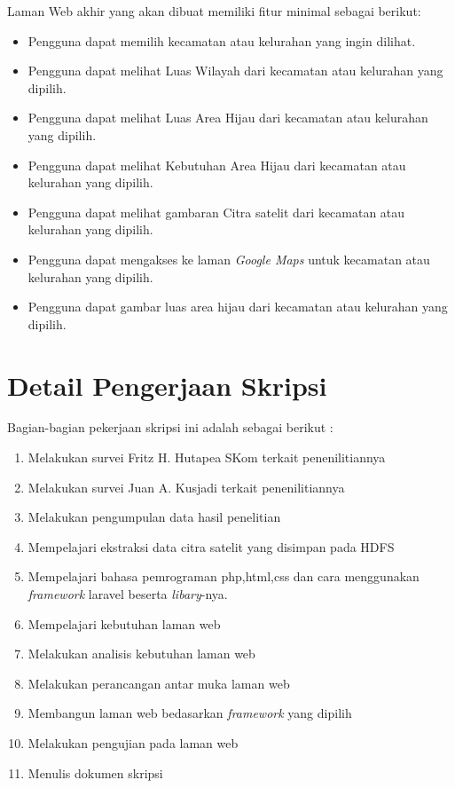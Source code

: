 \documentclass[a4paper,twoside]{article}
\begin{document}
Laman Web akhir yang akan dibuat memiliki fitur minimal sebagai berikut:
\begin{itemize}
	\item Pengguna dapat memilih kecamatan atau kelurahan yang ingin dilihat.
	\item Pengguna dapat melihat Luas Wilayah dari kecamatan atau kelurahan yang dipilih.
	\item Pengguna dapat melihat Luas Area Hijau dari kecamatan atau kelurahan yang dipilih.
	\item Pengguna dapat melihat Kebutuhan Area Hijau dari kecamatan atau kelurahan yang dipilih.
	\item Pengguna dapat melihat gambaran Citra satelit dari kecamatan atau kelurahan yang dipilih.
	\item Pengguna dapat mengakses ke laman \emph{Google Maps} untuk kecamatan atau kelurahan yang dipilih.
	\item Pengguna dapat gambar luas area hijau dari kecamatan atau kelurahan yang dipilih.
		
\end{itemize}

\section{Detail Pengerjaan Skripsi}
Bagian-bagian pekerjaan skripsi ini adalah sebagai berikut :
	\begin{enumerate}
		\item Melakukan survei Fritz H. Hutapea SKom terkait penenilitiannya
		\item Melakukan survei Juan A. Kusjadi terkait penenilitiannya
		\item Melakukan pengumpulan data hasil penelitian
		\item Mempelajari ekstraksi data citra satelit yang disimpan pada HDFS
		\item Mempelajari bahasa pemrograman php,html,css dan cara menggunakan \emph{framework} laravel beserta \emph{libary}-nya.
		\item Mempelajari kebutuhan laman web
		\item Melakukan analisis kebutuhan laman web
		\item Melakukan perancangan antar muka laman web
		\item Membangun laman web bedasarkan \emph{framework} yang dipilih
		\item Melakukan pengujian pada laman web
		\item Menulis dokumen skripsi
	\end{enumerate}
\end{document}
